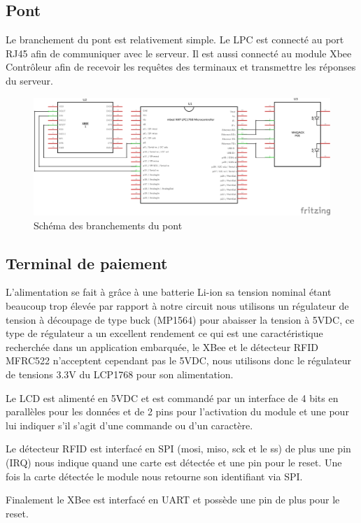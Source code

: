 	\subsection{Pont}
	Le branchement du pont est relativement simple. Le LPC est connecté au port RJ45 afin de communiquer avec le serveur. Il est aussi connecté au module Xbee Contrôleur afin de recevoir les requêtes des terminaux et transmettre les réponses du serveur.

	\begin{figure}[p]
		\includegraphics[width=\textwidth]{Pictures/Branchements/Pont}
		\caption{Schéma des branchements du pont}
		\label{fig.branchPont}
	\end{figure}

	\subsection{Terminal de paiement}
	L’alimentation se fait à grâce à une batterie Li-ion sa tension nominal étant beaucoup trop élevée par rapport à notre circuit nous utilisons un régulateur de tension à découpage de type buck (MP1564) pour abaisser la tension à 5VDC, ce type de régulateur a un excellent rendement ce qui est une caractéristique recherchée dans un application embarquée, le XBee et le détecteur RFID MFRC522 n’acceptent cependant pas le 5VDC, nous utilisons donc le régulateur de tensions 3.3V du LCP1768  pour son alimentation. 

	Le LCD est alimenté en 5VDC et est commandé par un interface de 4 bits en parallèles pour les données et de 2 pins pour l’activation du module et une pour lui indiquer s’il s’agit d’une commande ou d’un caractère. 

	Le détecteur RFID est interfacé en SPI (mosi, miso, sck et le ss) de plus une pin (IRQ) nous indique quand une carte est détectée et une pin pour le reset. Une fois la carte détectée le module nous retourne son identifiant via SPI.

	Finalement le XBee est interfacé en UART et possède une pin de plus pour le reset.

